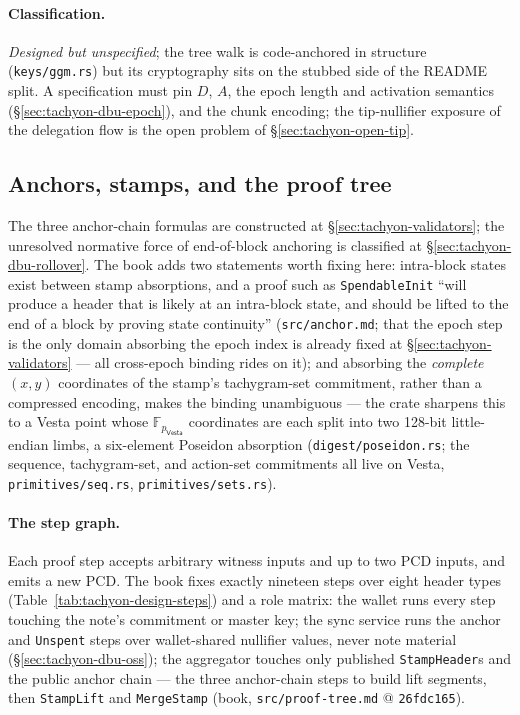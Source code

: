 \documentclass[11pt,a4paper]{article}
\theoremstyle{definition}
\newcommand{\F}{\mathbb{F}}
\newcommand{\Vesta}{\ensuremath{\mathsf{Vesta}}}
\begin{document}
\paragraph{Classification.} \emph{Designed but unspecified}; the tree walk
is code-anchored in structure (\texttt{keys/ggm.rs}) but its cryptography
sits on the stubbed side of the README split. A specification must pin
$D$, $A$, the epoch length and activation semantics
(\S\ref{sec:tachyon-dbu-epoch}), and the chunk encoding; the tip-nullifier
exposure of the delegation flow is the open problem of
\S\ref{sec:tachyon-open-tip}.

\subsection{Anchors, stamps, and the proof tree}\label{sec:tachyon-design-tree}

The three anchor-chain formulas are constructed at
\S\ref{sec:tachyon-validators}; the unresolved normative force of
end-of-block anchoring is classified at \S\ref{sec:tachyon-dbu-rollover}.
The book adds two statements worth fixing here: intra-block states exist
between stamp absorptions, and a proof such as \texttt{SpendableInit}
``will produce a header that is likely at an intra-block state, and should
be lifted to the end of a block by proving state continuity''
(\texttt{src/anchor.md}; that the epoch step is the only domain absorbing
the epoch index is already fixed at \S\ref{sec:tachyon-validators} --- all
cross-epoch binding rides on it); and absorbing
the \emph{complete} $(x, y)$ coordinates of the stamp's tachygram-set
commitment, rather than a compressed encoding, makes the binding
unambiguous --- the crate sharpens this to a Vesta point whose
$\F_{p_{\Vesta}}$ coordinates are each split into two 128-bit
little-endian limbs, a six-element Poseidon absorption
(\texttt{digest/poseidon.rs}; the sequence, tachygram-set, and action-set
commitments all live on Vesta, \texttt{primitives/seq.rs},
\texttt{primitives/sets.rs}).

\paragraph{The step graph.} Each proof step accepts arbitrary witness
inputs and up to two PCD inputs, and emits a new PCD. The book fixes
exactly nineteen steps over eight header types
(Table~\ref{tab:tachyon-design-steps}) and a role matrix: the wallet runs
every
step touching the note's commitment or master key; the sync service runs
the anchor and \texttt{Unspent} steps over wallet-shared nullifier values,
never note material (\S\ref{sec:tachyon-dbu-oss}); the aggregator touches
only published \texttt{StampHeader}s and the public anchor chain --- the
three anchor-chain steps to build lift segments, then \texttt{StampLift}
and \texttt{MergeStamp} (book, \texttt{src/proof-tree.md} @
\texttt{26fdc165}).
\end{document}
